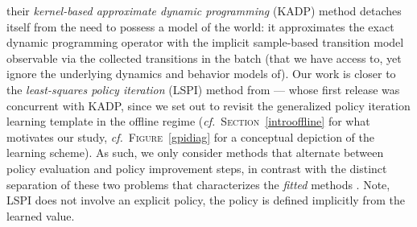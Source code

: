 their \textit{kernel-based approximate dynamic programming} (KADP) method
detaches itself from the need to possess a model of the world:
it approximates the exact dynamic programming operator
with the implicit sample-based transition model observable via the
collected transitions in the batch
(that we have access to, yet ignore the underlying dynamics and behavior models of).
Our work is closer to the \textit{least-squares policy iteration} (LSPI) method
from \cite{Lagoudakis2003-gp}
--- whose first release was concurrent with KADP,
since we set out to revisit the generalized policy iteration learning template in the offline regime
(\textit{cf.}~\textsc{Section}~\ref{introoffline} for what motivates our study,
\textit{cf.}~\textsc{Figure}~\ref{gpidiag} for a conceptual depiction of the learning scheme).
As such, we only consider methods that alternate between policy evaluation and
policy improvement steps, in contrast with the distinct separation of these two problems that characterizes the
\textit{fitted} methods \cite{Gordon1995-er, Ernst2005-sf, Riedmiller2005-ok,
Antos2007-bw, Neumann2008-tm, Lange2010-mq, Hafner2011-rv}.
Note, LSPI \cite{Lagoudakis2003-gp}
does not involve an explicit policy, the policy is defined implicitly from the learned value.

